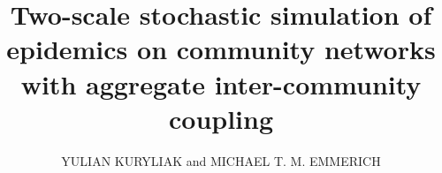\documentclass{ieeeaccess}
\let\AccessYear\year
\let\year\TeXyear
\begin{document}
\AccessYear{XXXX}
\title{Two-scale stochastic simulation of epidemics on community networks with aggregate inter-community coupling}
\author{\uppercase{Yulian Kuryliak} and \uppercase{Michael T. M. Emmerich}}
\address[1]{Institute of Computer Science and Information Technologies, Lviv Polytechnic National University, 12 Stepan Bandera Street, Lviv 79000, Ukraine (e-mail: yulian.a.kuryliak@lpnu.ua)}
\address[2]{Faculty of Information Technology, University of Jyv\"askyl\"a, P.O. Box 35 (Agora), FI-40014 Jyv\"askyl\"a, Finland (e-mail: michael.t.m.emmerich@jyu.fi)}
\end{document}
